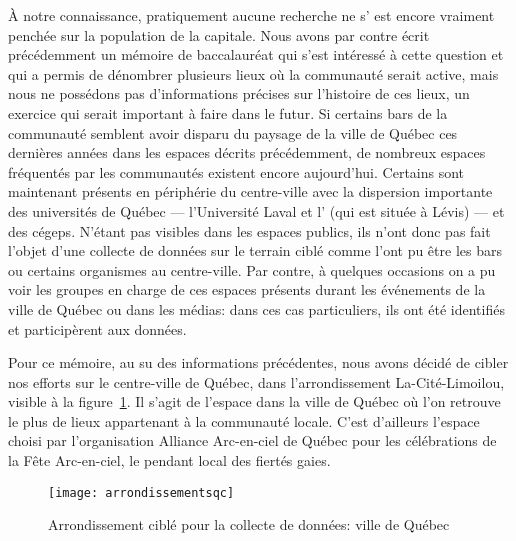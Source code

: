 À notre connaissance, pratiquement aucune recherche ne s’ est encore vraiment penchée sur la population \lgbt{} de la capitale.
Nous avons par contre écrit précédemment un mémoire de baccalauréat qui s'est intéressé à cette question et qui a permis de dénombrer plusieurs lieux où la communauté serait active, mais nous ne possédons pas d'informations précises sur l'histoire de ces lieux, un exercice qui serait important à faire dans le futur.
Si certains bars de la communauté semblent avoir disparu du paysage de la ville de Québec ces dernières années dans les espaces décrits précédemment, de nombreux espaces fréquentés par les communautés \lgbt{} existent encore aujourd'hui.
Certains sont maintenant présents en périphérie du centre-ville avec la dispersion importante des universités de Québec --- l'Université Laval et l'\uqar{} (qui est située à Lévis) --- et des cégeps.
N'étant pas visibles dans les espaces publics, ils n'ont donc pas fait l'objet d'une collecte de données sur le terrain ciblé comme l'ont pu être les bars ou certains organismes au centre-ville.
Par contre, à quelques occasions on a pu voir les groupes en charge de ces espaces présents durant les événements \lgbt{} de la ville de Québec ou dans les médias: dans ces cas particuliers, ils ont été identifiés et participèrent aux données.

Pour ce mémoire, au su des informations précédentes, nous avons décidé de cibler nos efforts sur le centre-ville de Québec, dans l'arrondissement La-Cité-Limoilou, visible à la figure~\ref{fig:arrondissementsqc}.
Il s'agit de l'espace dans la ville de Québec où l'on retrouve le plus de lieux appartenant à la communauté \lgbt{} locale.
C'est d'ailleurs l'espace choisi par l'organisation Alliance Arc-en-ciel de Québec pour les célébrations de la Fête Arc-en-ciel, le pendant local des fiertés gaies.

\begin{figure}[ht]
 \centering
 \texttt{[image: arrondissementsqc]}
 \caption[Arrondissement ciblé: ville de Québec]{Arrondissement ciblé pour la collecte de données: ville de Québec}\label{fig:arrondissementsqc}
\end{figure}

